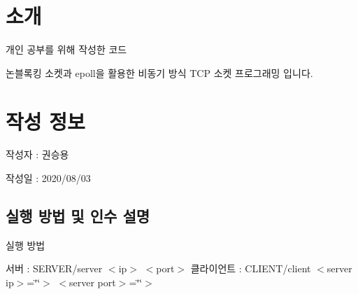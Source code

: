 \hypertarget{index_intro}{}\section{소개}\label{index_intro}

\begin{DoxyItemize}
\item 개인 공부를 위해 작성한 코드
\item 논블록킹 소켓과 epoll을 활용한 비동기 방식 T\-C\-P 소켓 프로그래밍 입니다. 
\end{DoxyItemize}\hypertarget{index_CreateInfo}{}\section{작성 정보}\label{index_CreateInfo}

\begin{DoxyItemize}
\item 작성자 \-: 권승용
\item 작성일 \-: 2020/08/03 
\end{DoxyItemize}\hypertarget{index_exec}{}\subsection{실행 방법 및 인수 설명}\label{index_exec}

\begin{DoxyItemize}
\item 실행 방법\par
 서버 \-: S\-E\-R\-V\-E\-R/server $<$ip$>$ $<$port$>$ 클라이언트 \-: C\-L\-I\-E\-N\-T/client $<$server ip$>$=\char`\"{}\char`\"{}$>$ $<$server port$>$=\char`\"{}\char`\"{}$>$ 
\end{DoxyItemize}